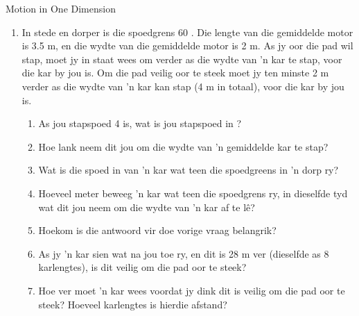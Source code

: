 \begin{eocexercises}{Motion in One Dimension}
\begin{enumerate}[noitemsep, label=\textbf{\arabic*}. ]
    \begin{enumerate}
    \item{Gebruik die grafiek om die volgende te vind:}
        \begin{enumerate}
            \item{Die spoed 5 s na die begin}
            \item{Die afstand afgel\^e in deel A}
            \item{Die versnelling in deel C}
        \end{enumerate} 
    \item Op tyd t$_1$ sny die snelheid teen tyd grafiek die tyd as. Gebruik die regte vergelyking van beweging om die waarde van tyd t$_1$ (in s) te vind.
    \item Skets die verplasing teen tyd grafiek vir die bewegin van die bal vir hierdie 12 sekondes. (Jy hoef nie die regte waardes te bereken vir elke tydinterval nie, maar gee aandag aan die algemene vorm van die grafiek vir elke interval)
    \end{enumerate}


    \item In stede en dorper is die spoedgrens 60 \kph. Die lengte van die gemiddelde motor is 3.5 m, en die wydte van die gemiddelde motor is 2 m. As jy oor die pad wil stap, moet jy in staat wees om verder as die wydte van 'n kar te stap, voor die kar by jou is. Om die pad veilig oor te steek moet jy ten minste 2 m verder as die wydte van 'n kar kan stap (4 m in totaal), voor die kar by jou is. 
    \begin{enumerate}
        \item As jou stapspoed 4 \kph is, wat is jou stapspoed in \ms?
        \item Hoe lank neem dit jou om die wydte van 'n gemiddelde kar te stap?
        \item Wat is die spoed in \ms van 'n kar wat teen die spoedgreens in 'n dorp ry?
        \item Hoeveel meter beweeg 'n kar wat teen die spoedgrens ry, in dieselfde tyd wat dit jou neem om die wydte van 'n kar af te l\^e?
        \item Hoekom is die antwoord vir doe vorige vraag belangrik?
        \item As jy 'n kar sien wat na jou toe ry, en dit is 28 m ver (dieselfde as 8 karlengtes), is dit veilig om die pad oor te steek?
        \item Hoe ver moet 'n kar wees voordat jy dink dit is veilig om die pad oor te steek? Hoeveel karlengtes is hierdie afstand?
    \end{enumerate}


\end{enumerate}
\end{eocexercises}
